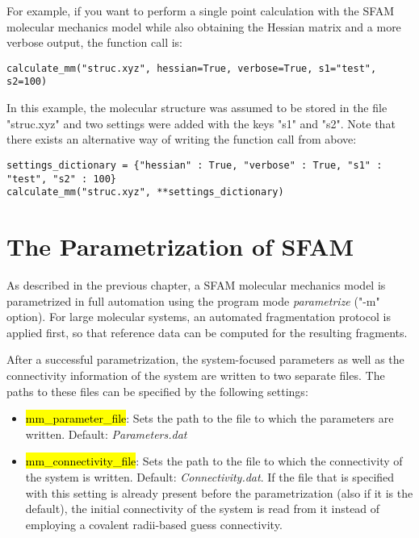 \documentclass[]{tufte-book}
\begin{document}
For example, if you want to perform a single point calculation with the SFAM molecular mechanics model while also obtaining the Hessian matrix and a more verbose output, the function call is:
\begin{mdframed}[backgroundcolor=LightSteelBlue!25, userdefinedwidth=13.7cm, linewidth=0pt]
\begin{verbatim}
calculate_mm("struc.xyz", hessian=True, verbose=True, s1="test", s2=100)
\end{verbatim}
\end{mdframed}
In this example, the molecular structure was assumed to be stored in the file "struc.xyz" and two settings were added with the keys "s1" and "s2". Note that there exists an alternative way of writing the function call from above:
\begin{mdframed}[backgroundcolor=LightSteelBlue!25, userdefinedwidth=16cm, linewidth=0pt]
\begin{verbatim}
settings_dictionary = {"hessian" : True, "verbose" : True, "s1" : "test", "s2" : 100}
calculate_mm("struc.xyz", **settings_dictionary)
\end{verbatim}
\end{mdframed}

\chapter{The Parametrization of SFAM}
\label{sec:parametrization}

As described in the previous chapter, a SFAM molecular mechanics model is parametrized in full automation using the program mode \textit{parametrize} ("-m" option). For large molecular systems, an automated fragmentation protocol is applied first, so that reference data can be computed for the resulting fragments.

After a successful parametrization, the system-focused parameters as well as the connectivity information of the system are written to two separate files.
The paths to these files can be specified by the following settings:

\begin{itemize}
\item \hl{mm\_parameter\_file}: Sets the path to the file to which the parameters are written. Default: \textit{Parameters.dat}
\item \hl{mm\_connectivity\_file}: Sets the path to the file to which the connectivity of the system is written. Default: \textit{Connectivity.dat}. If the file that is specified with this setting is already present before the parametrization (also if it is the default), the initial connectivity of the system is read from it instead of employing a covalent radii-based guess connectivity.
\end{itemize}
\end{document}
